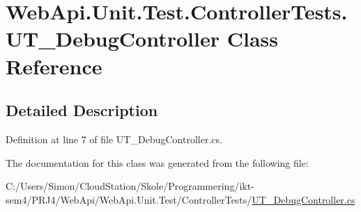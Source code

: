 \hypertarget{class_web_api_1_1_unit_1_1_test_1_1_controller_tests_1_1_u_t___debug_controller}{}\section{Web\+Api.\+Unit.\+Test.\+Controller\+Tests.\+U\+T\+\_\+\+Debug\+Controller Class Reference}
\label{class_web_api_1_1_unit_1_1_test_1_1_controller_tests_1_1_u_t___debug_controller}


\subsection{Detailed Description}


Definition at line 7 of file U\+T\+\_\+\+Debug\+Controller.\+cs.



The documentation for this class was generated from the following file\+:\begin{DoxyCompactItemize}
\item 
C\+:/\+Users/\+Simon/\+Cloud\+Station/\+Skole/\+Programmering/ikt-\/sem4/\+P\+R\+J4/\+Web\+Api/\+Web\+Api.\+Unit.\+Test/\+Controller\+Tests/\mbox{\hyperlink{_u_t___debug_controller_8cs}{U\+T\+\_\+\+Debug\+Controller.\+cs}}\end{DoxyCompactItemize}
